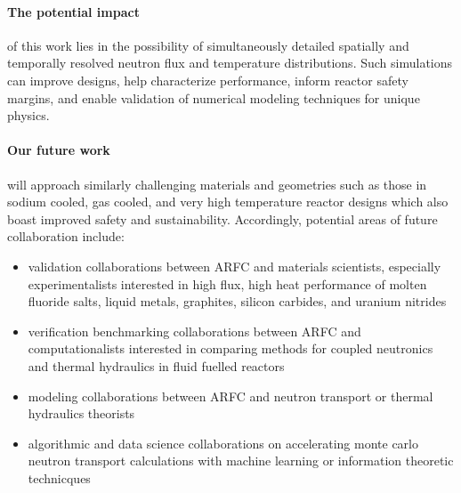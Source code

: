 \documentclass[11pt]{article}
\begin{document}
\paragraph{The potential impact} of this work lies in the possibility of 
simultaneously detailed spatially and temporally resolved neutron flux and
temperature distributions. Such simulations can improve designs, help characterize
performance, inform reactor safety margins, and enable validation of numerical
modeling techniques for unique physics.

\paragraph{Our future work} will approach similarly challenging materials and
geometries such as those in sodium cooled, gas cooled, and very high
temperature reactor designs which also boast improved safety and
sustainability. Accordingly, potential areas of future collaboration include: 

\begin{itemize}
        \item validation collaborations between \gls{ARFC} and materials scientists, especially 
                experimentalists interested in high flux, high heat performance of 
                molten fluoride salts, liquid metals, graphites, silicon 
                carbides, and uranium nitrides
        \item verification benchmarking collaborations between \gls{ARFC} and computationalists 
                interested in comparing methods for coupled neutronics and 
                thermal hydraulics in fluid fuelled reactors
        \item modeling collaborations between \gls{ARFC} and neutron transport 
                or thermal hydraulics theorists 
        \item algorithmic and data science collaborations on accelerating monte 
                carlo neutron transport calculations with machine learning or 
                information theoretic technicques
\end{itemize}









\end{document}
